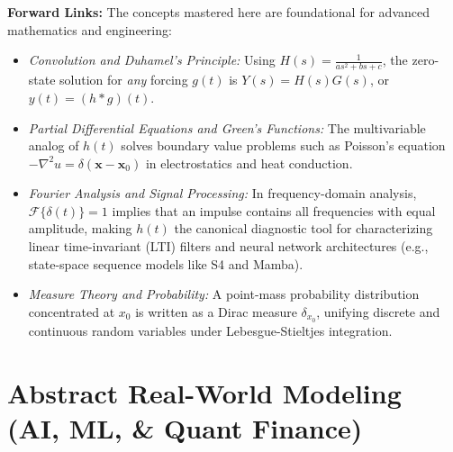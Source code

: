 \documentclass[11pt, letterpaper]{article}
\theoremstyle{definition}
\theoremstyle{remark}
\begin{document}
\textbf{Forward Links:} The concepts mastered here are foundational for advanced mathematics and engineering:
\begin{itemize}
    \item \emph{Convolution and Duhamel's Principle:} Using $H(s) = \frac{1}{as^2 + bs + c}$, the zero-state solution for \emph{any} forcing $g(t)$ is $Y(s) = H(s)G(s)$, or $y(t) = (h * g)(t)$.
    \item \emph{Partial Differential Equations and Green's Functions:} The multivariable analog of $h(t)$ solves boundary value problems such as Poisson's equation $-\nabla^2 u = \delta(\mathbf{x} - \mathbf{x}_0)$ in electrostatics and heat conduction.
    \item \emph{Fourier Analysis and Signal Processing:} In frequency-domain analysis, $\mathcal{F}\{\delta(t)\} = 1$ implies that an impulse contains all frequencies with equal amplitude, making $h(t)$ the canonical diagnostic tool for characterizing linear time-invariant (LTI) filters and neural network architectures (e.g., state-space sequence models like S4 and Mamba).
    \item \emph{Measure Theory and Probability:} A point-mass probability distribution concentrated at $x_0$ is written as a Dirac measure $\delta_{x_0}$, unifying discrete and continuous random variables under Lebesgue-Stieltjes integration.
\end{itemize}

\newpage

\section{Abstract Real-World Modeling (AI, ML, \& Quant Finance)}
\end{document}
